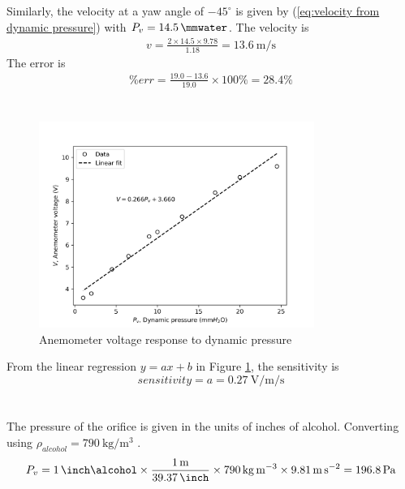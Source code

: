 \section{}
Similarly, the velocity at a yaw angle of $-45^\circ$ is given by (\ref{eq:velocity from dynamic pressure}) with 
$P_v = \qty{14.5}{\mmwater}$. The velocity is
\begin{align*}
    v = \frac{2 \times 14.5 \times 9.78}{1.18} = \boxed{\qty{13.6}{\meter\per\second}}
\end{align*}
The error is
\begin{align*}
    \% err = \frac{19.0 - 13.6}{19.0} \times 100\% = \boxed{28.4\%}
\end{align*}

\section{}
\begin{figure}[h]
    \centering
    \includegraphics[width=0.8\textwidth]{matplotlib/anemometer_calibration.png}
    \caption{Anemometer voltage response to dynamic pressure}
    \label{fig:anemometer_calibration}
\end{figure}

From the linear regression $y = ax + b$ in Figure \ref{fig:anemometer_calibration}, the sensitivity is
\begin{equation*}
    sensitivity = a = \boxed{\qty{0.27}{\volt\per\meter\per\second}}
\end{equation*}

\section{}
The pressure of the orifice is given in the units of inches of alcohol. Converting using $\rho_{alcohol} = \qty{790}{\kilogram\per\meter\cubed}$ 
\cite{ferner_alcohol_2001}.
\begin{align*}
    P_v = \qty{1}{\inch\alcohol} \times \frac{\qty{1}{\meter}}{\qty{39.37}{\inch}} \times 
    \qty{790}{\kilogram\per\meter\cubed} \times \qty{9.81}{\meter\per\second\squared} = \qty{196.8}{\pascal}
\end{align*}

